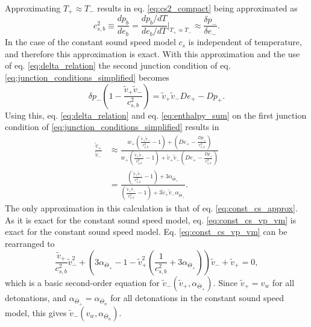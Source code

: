 Approximating $T_+ \approx T_-$ results in eq. \eqref{eq:cs2_compact} being approximated as
\begin{equation}
c_{s,b}^2
\equiv \frac{dp_b}{de_b}
= \frac{dp_b/dT}{de_b/dT} \big|_{T_+ \approx T_-}
\approx \frac{\delta p_-}{\delta e_-}.
\label{eq:const_cs_approx}
\end{equation}
In the case of the constant sound speed model $c_{s}$ is independent of temperature, and therefore this approximation is exact.
With this approximation and the use of eq. \eqref{eq:delta_relation} the second junction condition of eq. \eqref{eq:junction_conditions_simplified} becomes
\begin{equation}
\delta p_- \left(1 - \frac{\tilde{v}_+ \tilde{v}_-}{c_{s,b}^2} \right) = \tilde{v}_+ \tilde{v}_- De_+ - Dp_+.
\end{equation}
Using this, eq. \eqref{eq:delta_relation} and eq. \eqref{eq:enthalpy_sum} on the first junction condition of \eqref{eq:junction_conditions_simplified} results in
\begin{align}
\frac{\tilde{v}_+}{\tilde{v}_-}
&\approx \frac{
w_+ \left( \frac{\tilde{v}_+ \tilde{v}_-}{c_{s,b}^2} - 1 \right) + \left( De_+ - \frac{Dp_+}{c_{s,b}^2} \right)
}{
w_+ \left( \frac{\tilde{v}_+ \tilde{v}_-}{c_{s,b}^2} - 1 \right) + \tilde{v}_+ \tilde{v}_- \left( De_+ - \frac{Dp_+}{c_{s,b}^2} \right)
} \\
&= \frac{ \left( \frac{\tilde{v}_+ \tilde{v}_-}{c_{s,b}^2} - 1 \right) + 3 \alpha_{\bar{\Theta}_+}
}{
\left( \frac{\tilde{v}_+ \tilde{v}_-}{c_{s,b}^2} - 1 \right) + 3\tilde{v}_+ \tilde{v}_- \alpha_{\bar{\Theta}_+}}.
\label{eq:const_cs_vp_vm}
\end{align}
The only approximation in this calculation is that of eq. \eqref{eq:const_cs_approx}.
As it is exact for the constant sound speed model,
eq. \eqref{eq:const_cs_vp_vm} is exact for the constant sound speed model.
Eq. \eqref{eq:const_cs_vp_vm} can be rearranged to
\begin{equation}
\frac{\tilde{v}_+}{c_{s,b}^2} \tilde{v}_-^2
+ \left(3 \alpha_{\bar{\Theta}_+} - 1 - \tilde{v}_+^2 \left(\frac{1}{c_{s,b}^2} + 3 \alpha_{\bar{\Theta}_+} \right) \right) \tilde{v}_-
+ \tilde{v}_+
= 0,
\end{equation}
which is a basic second-order equation for $\tilde{v}_- ( \tilde{v}_+, \alpha_{\bar{\Theta}_+} )$.
Since $\tilde{v}_+ = v_w$ for all detonations, and $\alpha_{\bar{\Theta}_+} = \alpha_{\bar{\Theta}_n}$ for all detonations in the constant sound speed model, this gives $\tilde{v}_- ( v_w, \alpha_{\bar{\Theta}_n} )$.
